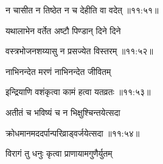 
{\devanagarifont न चासीत न तिष्ठेत न च देहीति वा वदेत् {॥११:५१॥} \veg\dontdisplaylinenum }%
 
{\devanagarifont यथालाभेन वर्तेत अष्टौ पिण्डान् दिने दिने \thinspace{\dandab} \dontdisplaylinenum }%


{\devanagarifont वस्त्रभोजनशय्यासु न प्रसज्येत विस्तरम् {॥११:५२॥} \veg\dontdisplaylinenum }%

{\devanagarifont नाभिनन्देत मरणं नाभिनन्देत जीवितम् \thinspace{\dandab} \dontdisplaylinenum }%


{\devanagarifont इन्द्रियाणि वशंकृत्वा कामं हत्वा यतव्रतः {॥११:५३॥} \veg\dontdisplaylinenum }%

{\devanagarifont अतीतं च भविष्यं च न भिक्षुश्चिन्तयेत्सदा \thinspace{\dandab} \dontdisplaylinenum }%


{\devanagarifont क्रोधमानमददर्पान्परिव्राड्वर्जयेत्सदा {॥११:५४॥} \veg\dontdisplaylinenum }%

{\devanagarifont विरागं तु धनुः कृत्वा प्राणायामगुणैर्युतम् \thinspace{\dandab} \dontdisplaylinenum }%

